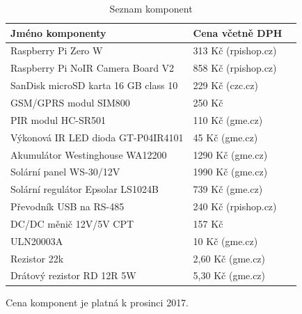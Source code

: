 \begin{table}[h]
\centering
\caption{Seznam komponent}
\label{komponenty}
\begin{tabular}{|l|l|l|}
\hline
\textbf{Jméno komponenty}                          & \textbf{Cena včetně DPH} \\ \hline
Raspberry Pi Zero W                                & 313 Kč (rpishop.cz)      \\ \hline
Raspberry Pi NoIR Camera Board V2                  & 858 Kč (rpishop.cz)      \\ \hline
SanDisk microSD karta 16 GB class 10                & 229 Kč (czc.cz)          \\ \hline
GSM/GPRS modul SIM800                              & 250 Kč                  \\ \hline
PIR modul HC-SR501                                 & 110 Kč (gme.cz)          \\ \hline
Výkonová IR LED dioda GT-P04IR4101                 & 45 Kč (gme.cz)           \\ \hline
Akumulátor Westinghouse WA12200                    & 1290 Kč (gme.cz)         \\ \hline
Solární panel WS-30/12V                            & 1990 Kč (gme.cz)         \\ \hline
Solární regulátor Epsolar LS1024B                  & 739 Kč (gme.cz)          \\ \hline
Převodník USB na RS-485                            & 240 Kč (rpishop.cz)        \\ \hline
DC/DC měnič 12V/5V CPT                             & 157 Kč                   \\ \hline
ULN20003A                                     & 10 Kč (gme.cz)           \\ \hline
Rezistor 22k                                       & 2,60 Kč (gme.cz)         \\ \hline
Drátový rezistor RD 12R 5W                         & 5,30 Kč (gme.cz)         \\ \hline
\end{tabular}
\end{table}

Cena komponent je platná k prosinci 2017.
